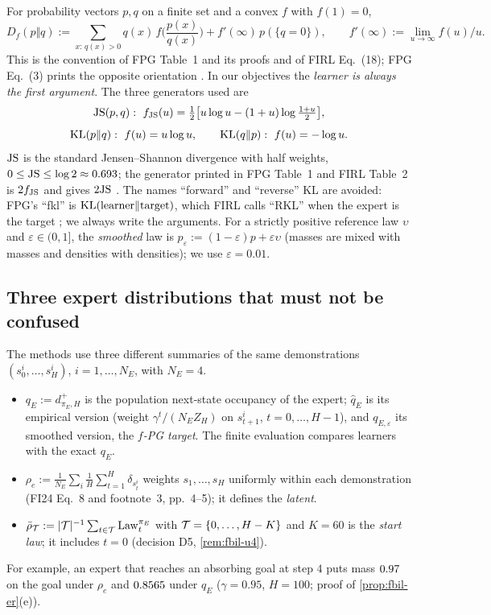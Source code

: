 For probability vectors $p,q$ on a finite set and a convex $f$ with $f(1)=0$,
\begin{equation}\label{eq:m-div}
D_f(p\Vert q):=\sum_{x:\,q(x)>0}q(x)\,f\Big(\frac{p(x)}{q(x)}\Big)+f'(\infty)\,p(\{q=0\}),\qquad f'(\infty):=\lim_{u\to\infty}f(u)/u .
\end{equation}
This is the convention of FPG Table~1 and its proofs and of FIRL Eq.~(18); FPG Eq.~(3) prints the opposite orientation .
In our objectives the \emph{learner is always the first argument}.
The three generators used are
\[
\JS(p,q):\ f_{\JS}(u)=\tfrac12\big[u\log u-(1+u)\log\tfrac{1+u}2\big],
\]
\[
\KL(p\Vert q):\ f(u)=u\log u,\qquad
\KL(q\Vert p):\ f(u)=-\log u .
\]
$\JS$ is the standard Jensen--Shannon divergence with half weights, $0\le\JS\le\log2\approx\vn{const.log2}{0.693}$; the generator printed in FPG Table~1 and FIRL Table~2 is $2f_{\JS}$ and gives $2\JS$ .
The names ``forward'' and ``reverse'' KL are avoided: FPG's ``fkl'' is $\KL(\text{learner}\Vert\text{target})$, which FIRL calls ``RKL'' when the expert is the target ; we always write the arguments.
For a strictly positive reference law $\upsilon$ and $\varepsilon\in(0,1]$, the \emph{smoothed} law is $p_\varepsilon:=(1-\varepsilon)p+\varepsilon\upsilon$ (masses are mixed with masses and densities with densities); we use $\varepsilon=0.01$.

\subsection{Three expert distributions that must not be confused}\label{sec:m-expert-laws}

The methods use three different summaries of the same demonstrations $(s^i_0,\dots,s^i_H)$, $i=1,\dots,N_E$, with $N_E=4$.
\begin{itemize}[nosep]
\item $q_E:=d^+_{\pi_E,H}$ is the population next-state occupancy of the expert; $\hat q_E$ is its empirical version (weight $\gamma^t/(N_EZ_H)$ on $s^i_{t+1}$, $t=0,\dots,H-1$), and $q_{E,\varepsilon}$ its smoothed version, the \emph{$f$-PG target}. The finite evaluation compares learners with the exact $q_E$.
\item $\rho_e:=\frac1{N_E}\sum_i\frac1H\sum_{t=1}^H\delta_{s^i_t}$ weights $s_1,\dots,s_H$ uniformly within each demonstration (FI24 Eq.~8 and footnote~3, pp.~4--5); it defines the \emph{\ERFB{} latent}.
\item $\bar\rho_{\cT}:=|\cT|^{-1}\sum_{t\in\cT}\law^{\pi_E}_t$ with $\cT=\{0,\dots,H-K\}$ and $K=60$ is the \emph{\DMFB{} start law}; it includes $t=0$ (decision D5, \cref{rem:fbil-u4}).
\end{itemize}
For example, an expert that reaches an absorbing goal at step $4$ puts mass $\vn{const.dwell.rho}{0.97}$ on the goal under $\rho_e$ and $\vn{const.dwell.qE}{0.8565}$ under $q_E$ ($\gamma=0.95$, $H=100$; proof of \cref{prop:fbil-er}(e)).

